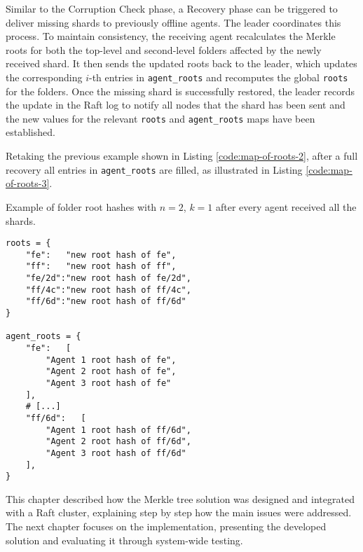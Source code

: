 Similar to the Corruption Check phase, a Recovery phase can be triggered to deliver missing shards to previously offline agents. The leader coordinates this process. To maintain consistency, the receiving agent recalculates the Merkle roots for both the top-level and second-level folders affected by the newly received shard. It then sends the updated roots back to the leader, which updates the corresponding $i$-th entries in \texttt{agent\_roots} and recomputes the global \texttt{roots} for the folders. Once the missing shard is successfully restored, the leader records the update in the Raft log to notify all nodes that the shard has been sent and the new values for the relevant \texttt{roots} and \texttt{agent\_roots} maps have been established.

Retaking the previous example shown in Listing \ref{code:map-of-roots-2}, after a full recovery all entries in \texttt{agent\_roots} are filled, as illustrated in Listing \ref{code:map-of-roots-3}.

\begin{listing}[H]
\caption{Example of folder root hashes with $n=2$, $k=1$ after every agent received all the shards.}
\label{code:map-of-roots-3}
\begin{verbatim}
roots = {
    "fe":   "new root hash of fe",
    "ff":   "new root hash of ff",
    "fe/2d":"new root hash of fe/2d",
    "ff/4c":"new root hash of ff/4c",
    "ff/6d":"new root hash of ff/6d"
}

agent_roots = {
    "fe":   [
        "Agent 1 root hash of fe",
        "Agent 2 root hash of fe",
        "Agent 3 root hash of fe"
    ],
    # [...]
    "ff/6d":   [
        "Agent 1 root hash of ff/6d",
        "Agent 2 root hash of ff/6d",
        "Agent 3 root hash of ff/6d"
    ],
}
\end{verbatim}
\end{listing}

This chapter described how the Merkle tree solution was designed and integrated with a Raft cluster, explaining step by step how the main issues were addressed. The next chapter focuses on the implementation, presenting the developed solution and evaluating it through system-wide testing.

